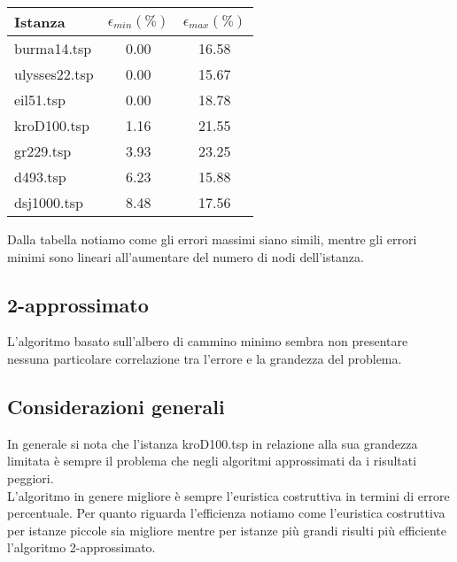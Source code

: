 \documentclass{article}
\begin{document}
\begin{table}[H]
	\begin{tabular}{lcc}
		\toprule
		Istanza       & $\epsilon_{min}(\%)$ & $\epsilon_{max}(\%)$ \\
		\midrule
		burma14.tsp   & 0.00                 & 16.58                \\
		ulysses22.tsp & 0.00                 & 15.67                \\
		eil51.tsp     & 0.00                 & 18.78                \\
		kroD100.tsp   & 1.16                 & 21.55                \\
		gr229.tsp     & 3.93                 & 23.25                \\
		d493.tsp      & 6.23                 & 15.88                \\
		dsj1000.tsp   & 8.48                 & 17.56                \\
		\bottomrule
	\end{tabular}
\end{table}

\noindent Dalla tabella notiamo come gli errori massimi siano simili, mentre gli errori minimi sono lineari all'aumentare del numero di nodi dell'istanza.

\subsection*{2-approssimato}
L'algoritmo basato sull'albero di cammino minimo sembra non presentare nessuna particolare correlazione tra l'errore e la grandezza del problema.

\subsection*{Considerazioni generali}
In generale si nota che l'istanza kroD100.tsp in relazione alla sua grandezza limitata è sempre il problema che negli algoritmi approssimati da i risultati peggiori.\\
L'algoritmo in genere migliore è sempre l'euristica costruttiva in termini di errore percentuale. Per quanto riguarda l'efficienza notiamo come l'euristica costruttiva per istanze piccole sia migliore mentre per istanze più grandi risulti più efficiente l'algoritmo 2-approssimato.
\end{document}
